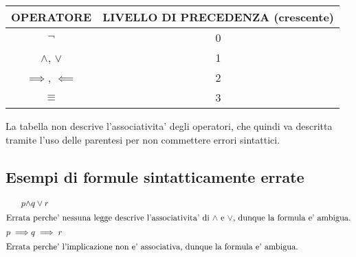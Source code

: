 \documentclass{report}
\newcommand{\AND}{\wedge}
\newcommand{\OR}{\vee}
\begin{document}
    \begin{table}[]
        \centering
        \begin{tabular}{|c|c|}
        \hline
        OPERATORE                   & LIVELLO DI PRECEDENZA (crescente)     \\ \hline
        $\neg$                      & 0                                     \\ \hline
        $\AND$, $\OR$               & 1                                     \\ \hline
        $\implies$, $\impliedby$    & 2                                     \\ \hline
        $\equiv$                    & 3                                     \\ \hline
        \end{tabular}
    \end{table}

    La tabella non descrive l'associativita' degli operatori, che quindi va descritta tramite
    l'uso delle parentesi per non commettere errori sintattici.

    \subsection{Esempi di formule sintatticamente errate}
    \begin{alignat*}
        {1}
        p \AND & q \OR r \\
        \intertext{Errata perche' nessuna legge descrive l'associativita' di $\AND$ e $\OR$,
        dunque la formula e' ambigua.}
        p \implies & q \implies r\\
        \intertext{Errata perche' l'implicazione non e' associativa, dunque la formula e'
        ambigua.}
    \end{alignat*}
\end{document}

